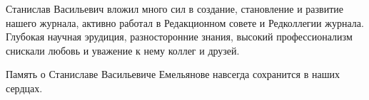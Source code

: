 Станислав Васильевич вложил много сил в создание, становление и развитие 
нашего журнала, активно работал в Редакционном совете и Редколлегии журнала. 
Глубокая научная эрудиция, разносторонние знания, высокий профессионализм 
снискали любовь и уважение к нему коллег и друзей.

\bigskip

Память о Станиславе Васильевиче Емельянове навсегда сохранится в наших сердцах.